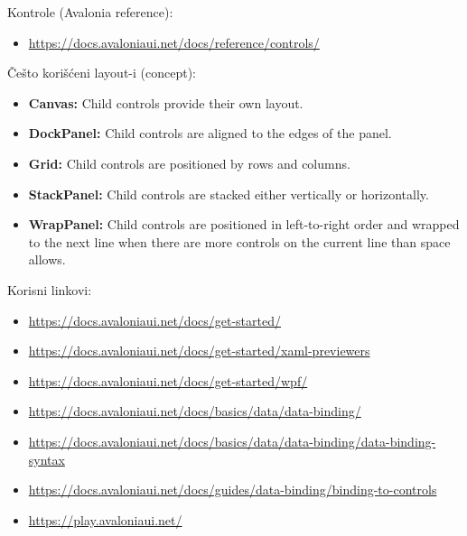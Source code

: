 \documentclass[11pt,a4paper]{article}
\begin{document}
Kontrole (Avalonia reference):

\begin{itemize}[leftmargin=*]
  \item \url{https://docs.avaloniaui.net/docs/reference/controls/}
\end{itemize}

Češto korišćeni layout-i (concept):

\begin{itemize}[leftmargin=*]
  \item \textbf{Canvas:} Child controls provide their own layout.
  \item \textbf{DockPanel:} Child controls are aligned to the edges of the panel.
  \item \textbf{Grid:} Child controls are positioned by rows and columns.
  \item \textbf{StackPanel:} Child controls are stacked either vertically or horizontally.
  \item \textbf{WrapPanel:} Child controls are positioned in left-to-right order and wrapped to the next line when there are more controls on the current line than space allows.
\end{itemize}

Korisni linkovi:

\begin{itemize}[leftmargin=*]
  \item \url{https://docs.avaloniaui.net/docs/get-started/}
  \item \url{https://docs.avaloniaui.net/docs/get-started/xaml-previewers}
  \item \url{https://docs.avaloniaui.net/docs/get-started/wpf/}
  \item \url{https://docs.avaloniaui.net/docs/basics/data/data-binding/}
  \item \url{https://docs.avaloniaui.net/docs/basics/data/data-binding/data-binding-syntax}
  \item \url{https://docs.avaloniaui.net/docs/guides/data-binding/binding-to-controls}
  \item \url{https://play.avaloniaui.net/}
\end{itemize}
\end{document}
